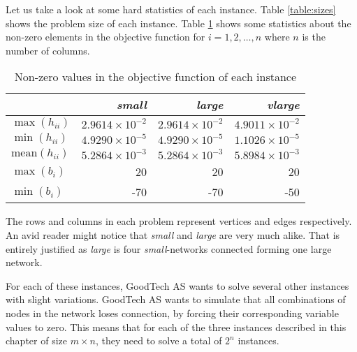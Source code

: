 Let us take a look at some hard statistics of each instance.
Table \ref{table:sizes} shows the problem size of each instance.
Table \ref{table:maxmin} shows some statistics about the non-zero elements in
the objective function for $i = 1,2,\ldots,n$ where $n$ is the number of
columns.
\begin{table}
    \centering
    \caption{Non-zero values in the objective function of each instance}
    \begin{tabular}{lrrr}
                        & \textit{small}          & \textit{large}          & \textit{vlarge} \\\hline
    $\max(h_{ii})$      & $2.9614 \times 10^{-2}$ & $2.9614 \times 10^{-2}$ & $4.9011 \times 10^{-2}$ \\
    $\min(h_{ii})$      & $4.9290 \times 10^{-5}$ & $4.9290 \times 10^{-5}$ & $1.1026 \times 10^{-5}$ \\
$\textrm{mean}(h_{ii})$ & $5.2864 \times 10^{-3}$ & $5.2864 \times 10^{-3}$ & $5.8984 \times 10^{-3}$ \\
    $\max(b_{i})$       & 20                      & 20                      & 20 \\
    $\min(b_{i})$       & -70                     & -70                     & -50 \\
    \end{tabular}
    \label{table:maxmin}
\end{table}
The rows and columns in each problem represent vertices and edges respectively.
An avid reader might notice that \textit{small} and \textit{large} are very
much alike.
That is entirely justified as \textit{large} is four \textit{small}-networks
connected forming one large network.

For each of these instances, GoodTech AS wants to solve several other instances
with slight variations. GoodTech AS wants to simulate that all combinations of
nodes in the network loses connection, by forcing their corresponding 
variable values to zero. This means that for each of the three instances
described in this chapter of size $m \times n$, they need to solve a total of
$2^n$ instances.
